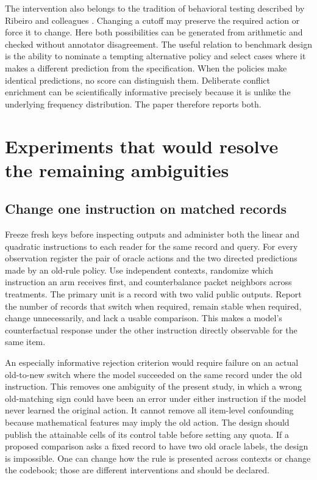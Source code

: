 \documentclass[12pt,letterpaper]{article}
\begin{document}
The intervention also belongs to the tradition of behavioral testing described by Ribeiro and colleagues \cite{checklist}. Changing a cutoff may preserve the required action or force it to change. Here both possibilities can be generated from arithmetic and checked without annotator disagreement. The useful relation to benchmark design is the ability to nominate a tempting alternative policy and select cases where it makes a different prediction from the specification. When the policies make identical predictions, no score can distinguish them. Deliberate conflict enrichment can be scientifically informative precisely because it is unlike the underlying frequency distribution. The paper therefore reports both.

\section{Experiments that would resolve the remaining ambiguities}\label{sec:next}
\subsection{Change one instruction on matched records}
Freeze fresh keys before inspecting outputs and administer both the linear and quadratic instructions to each reader for the same record and query. For every observation register the pair of oracle actions and the two directed predictions made by an old-rule policy. Use independent contexts, randomize which instruction an arm receives first, and counterbalance packet neighbors across treatments. The primary unit is a record with two valid public outputs. Report the number of records that switch when required, remain stable when required, change unnecessarily, and lack a usable comparison. This makes a model's counterfactual response under the other instruction directly observable for the same item.

An especially informative rejection criterion would require failure on an actual old-to-new switch where the model succeeded on the same record under the old instruction. This removes one ambiguity of the present study, in which a wrong old-matching sign could have been an error under either instruction if the model never learned the original action. It cannot remove all item-level confounding because mathematical features may imply the old action. The design should publish the attainable cells of its control table before setting any quota. If a proposed comparison asks a fixed record to have two old oracle labels, the design is impossible. One can change how the rule is presented across contexts or change the codebook; those are different interventions and should be declared.
\end{document}

